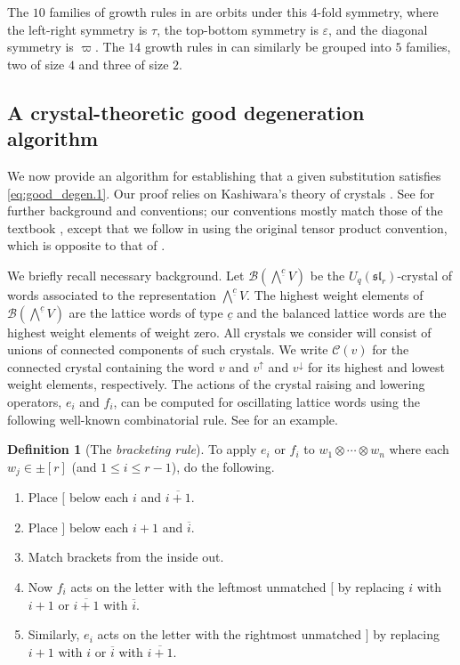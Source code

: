 \documentclass{amsart}
\theoremstyle{definition}
\newtheorem{definition}[theorem]{Definition}
\theoremstyle{remark}
\numberwithin{equation}{section}
\newcommand{\fsl}{\mathfrak{sl}}
\begin{document}
The $10$ families of growth rules in  are orbits under this $4$-fold symmetry, where the left-right symmetry is $\tau$, the top-bottom symmetry is $\varepsilon$, and the diagonal symmetry is $\varpi$. The $14$ growth rules in \cite{Khovanov-Kuperberg} can similarly be grouped into $5$ families, two of size $4$ and three of size $2$. 

\subsection{A crystal-theoretic good degeneration algorithm}\label{sec:crystal-algorithm}

We now provide an algorithm for establishing that a given substitution satisfies \eqref{eq:good_degen.1}. Our proof relies on Kashiwara's theory of crystals \cite{Kashiwara-Crystals}. See \cite[\S8]{fluctuating-paper} for further background and conventions; our conventions mostly match those of the textbook \cite{Bump-Schilling}, except that we follow \cite{Kashiwara-Crystals} in using the original tensor product convention, which is opposite to that of \cite{Bump-Schilling}.

We briefly recall necessary background. Let $\mathcal{B}(\bigwedge\nolimits^{\underline{c}} V)$ be the $U_q(\fsl_r)$-crystal of words associated to the representation $\bigwedge\nolimits^{\underline{c}} V$. The highest weight elements of $\mathcal{B}(\bigwedge\nolimits^{\underline{c}} V)$ are the lattice words of type $\underline{c}$ and the balanced lattice words are the highest weight elements of weight zero. All crystals we consider will consist of unions of connected components of such crystals. We write $\mathcal{C}(v)$ for the connected crystal containing the word $v$ and $v^\uparrow$ and $v^\downarrow$ for its highest and lowest weight elements, respectively. The actions of the crystal raising and lowering operators, $e_i$ and $f_i$, can be computed for oscillating lattice words using the following well-known combinatorial rule. See \cite[Ex.~8.12]{fluctuating-paper} for an example.

\begin{definition}[The \textit{bracketing rule}]\label{def:bracketing-rule}
   To apply $e_i$ or $f_i$ to $w_1 \otimes \cdots \otimes w_n$ where each $w_j \in \pm [r]$ (and $1 \leq i \leq r-1$), do the following.
    \begin{enumerate}[(1)]
      \item Place $[$ below each $i$ and $\overline{i+1}$.
      \item Place $]$ below each $i+1$ and $\overline{i}$.
      \item Match brackets from the inside out.
      \item Now $f_i$ acts on the letter with the leftmost unmatched $[$ by replacing $i$ with $i+1$ or $\overline{i+1}$ with $\overline{i}$.
      \item Similarly, $e_i$ acts on the letter with the rightmost unmatched $]$ by replacing $i+1$ with $i$ or $\overline{i}$ with $\overline{i+1}$.
    \end{enumerate}
\end{definition}
\end{document}
